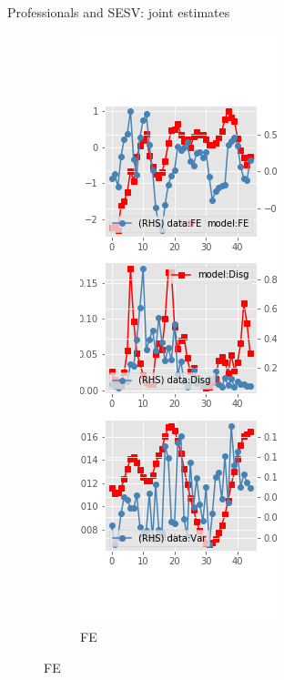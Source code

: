 \documentclass{beamer}
\begin{document}
\begin{frame}{Professionals and SESV: joint estimates}
	\begin{figure}[ht]
		\label{SESV_diag_joint_SPF}
		\begin{subfigure}[b]{0.2\textwidth}
			\centering
			\caption{FE}
			\includegraphics[width=\textwidth, height = 0.8\textheight]{figuresDraft/spf_se_est_sv_joint_diag0.png}

\end{subfigure}
\end{figure}
\end{frame}
\end{document}
